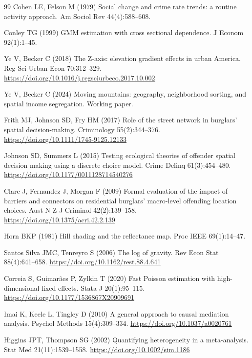 \documentclass[12pt,letterpaper]{article}
\begin{document}
\begin{thebibliography}{99}
Cohen LE, Felson M (1979) Social change and crime rate trends: a routine activity approach. Am Sociol Rev 44(4):588--608.

Conley TG (1999) GMM estimation with cross sectional dependence. J Econom 92(1):1--45.

Ye V, Becker C (2018) The Z-axis: elevation gradient effects in urban America. Reg Sci Urban Econ 70:312--329. \url{https://doi.org/10.1016/j.regsciurbeco.2017.10.002}

Ye V, Becker C (2024) Moving mountains: geography, neighborhood sorting, and spatial income segregation. Working paper.

Frith MJ, Johnson SD, Fry HM (2017) Role of the street network in burglars' spatial decision-making. Criminology 55(2):344--376. \url{https://doi.org/10.1111/1745-9125.12133}

Johnson SD, Summers L (2015) Testing ecological theories of offender spatial decision making using a discrete choice model. Crime Delinq 61(3):454--480. \url{https://doi.org/10.1177/0011128714540276}

Clare J, Fernandez J, Morgan F (2009) Formal evaluation of the impact of barriers and connectors on residential burglars' macro-level offending location choices. Aust N Z J Criminol 42(2):139--158. \url{https://doi.org/10.1375/acri.42.2.139}

Horn BKP (1981) Hill shading and the reflectance map. Proc IEEE 69(1):14--47.

Santos Silva JMC, Tenreyro S (2006) The log of gravity. Rev Econ Stat 88(4):641--658. \url{https://doi.org/10.1162/rest.88.4.641}

Correia S, Guimar\~aes P, Zylkin T (2020) Fast Poisson estimation with high-dimensional fixed effects. Stata J 20(1):95--115. \url{https://doi.org/10.1177/1536867X20909691}

Imai K, Keele L, Tingley D (2010) A general approach to causal mediation analysis. Psychol Methods 15(4):309--334. \url{https://doi.org/10.1037/a0020761}

Higgins JPT, Thompson SG (2002) Quantifying heterogeneity in a meta-analysis. Stat Med 21(11):1539--1558. \url{https://doi.org/10.1002/sim.1186}


\end{thebibliography}
\end{document}

